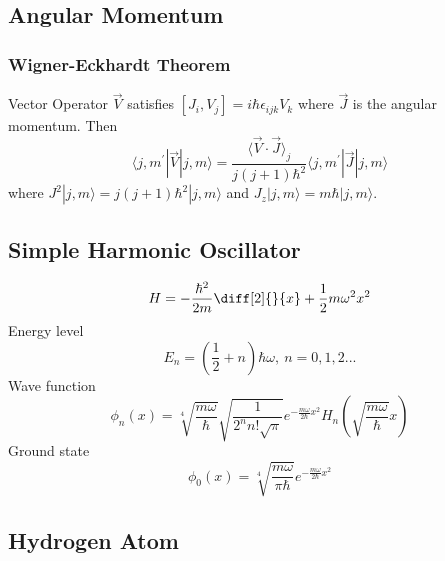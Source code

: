 \documentclass{article}
\newcommand{\ket}[1]{|#1\rangle}
\newcommand{\bra}[1]{\langle #1|}
\begin{document}
\subsection{Angular Momentum}
\subsubsection{Wigner-Eckhardt Theorem}
Vector Operator $\vec V$ satisfies $[J_i, V_j]=i\hbar \epsilon_{ijk} V_k$ where $\vec J$ is the
angular momentum. Then
$$\bra{j,m^\prime}\vec V \ket{j,m}=
\frac{\langle\vec V\cdot\vec J\rangle_j}{j(j+1)\hbar^2}\bra{j,m^\prime}\vec J\ket{j,m}$$
where $J^2\ket{j,m}=j(j+1)\hbar^2\ket{j,m}$ and $J_z\ket{j,m}=m\hbar\ket{j,m}$.
\subsection{Simple Harmonic Oscillator}
\begin{equation}
	H=-\frac{\hbar^2}{2m}\diff[2]{}{x}+\frac{1}{2}m\omega^2x^2
\end{equation}
Energy level
\begin{equation}
	E_n=(\frac{1}{2}+n)\hbar\omega,\ n=0,1,2...
\end{equation}
Wave function
\begin{equation}
	\phi_n(x)=\sqrt[4]{\frac{m\omega}{\hbar}}\sqrt{\frac{1}{2^nn!\sqrt{\pi}}}e^{-\frac{m\omega}{2\hbar}x^2}H_n(\sqrt{\frac{m\omega}{\hbar}}x)
\end{equation}
Ground state
\begin{equation}
	\phi_0(x)=\sqrt[4]{\frac{m\omega}{\pi\hbar}}e^{-\frac{m\omega}{2\hbar}x^2}
\end{equation}
\subsection{Hydrogen Atom}
\end{document}
